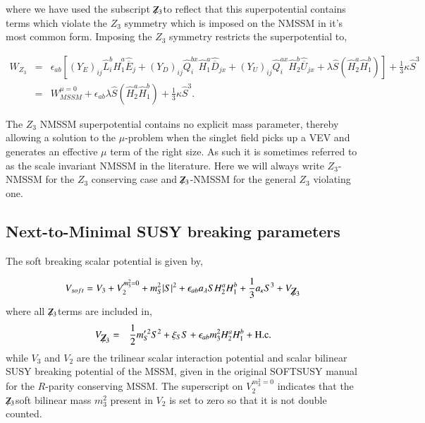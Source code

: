 \documentclass[final,3p,times,pdflatex]{elsarticle}
\newcommand{\be}{\begin{equation}}
\newcommand{\ee}{\end{equation}}
\newcommand{\ba}{\begin{eqnarray}}
\newcommand{\ea}{\end{eqnarray}}
\newcommand{\Zv}{{\mbox{${\not\!\!Z_3}$}}}
\begin{document}
\noindent where we have used the subscript \Zv to reflect that this superpotential contains terms which violate the $Z_3$ symmetry which is imposed on the NMSSM in it's most common form.  Imposing the $Z_3$ symmetry restricts the superpotential to,

\ba 
 W_{Z_3} &=& \epsilon_{ab} \left[ (Y_E)_{ij} \hat L_i^b
\hat H_1^a \hat{\overline E}_j + (Y_D)_{ij} \hat Q_i^{bx} \hat H_1^a \hat{\overline D}_{jx} +
(Y_U)_{ij} \hat Q_i^{ax} \hat H_2^b \hat{\overline U}_{jx}  
+\lambda \hat{S}(\hat{H}^a_2 \hat{H}^b_1) \right ]+\frac{1}{3}\kappa\hat{S}^3 \\
 &=& W_{MSSM}^{\mu =0}  + \epsilon_{ab} \lambda \hat{S} (\hat{H}^a_2 \hat{H}^b_1) +\frac{1}{3}\kappa\hat{S}^3.
\label{eq:WZ3C}
\ea


\noindent The $Z_3$ NMSSM superpotential contains no explicit mass parameter, thereby allowing a solution to the $\mu$-problem when the singlet field picks up a VEV and generates an effective $\mu$ term of the right size.   As such it is sometimes referred to as the scale invariant NMSSM in the literature.  Here we will always write $Z_3$-NMSSM for the $Z_3$ conserving case and \Zv-NMSSM for the general $Z_3$ violating one. 


\subsection{Next-to-Minimal SUSY breaking parameters \label{sec:susybreak}}
The soft breaking scalar potential is given by,

\be V_{soft} = V_3 + V^{m_3^2 = 0}_2 + m_S^2|S|^2 + \epsilon_{ab} a_\lambda S H^a_2 H^b_1 + \frac{1}{3} a_\kappa S^3 + V_\Zv \ee where all \Zv terms are included in,
\ba V_\Zv & = & \frac{1}{2}m_S^{\prime \, 2} S^2 + \xi_S S + \epsilon_{ab} m_3^2 H_2^a H_1^b + \textrm{H.c.} \ea while $V_3$ and $V_2$ are the trilinear scalar interaction potential and scalar bilinear SUSY breaking potential of the MSSM, given in the original SOFTSUSY manual for the $R$-parity conserving MSSM\cite{Allanach:2001kg}.   The superscript on $V^{m_3^2 = 0}_2$ indicates that the \Zv soft bilinear mass $m_3^2$ present in $V_2$ is set to zero so that it is not double counted. 

\end{document}
